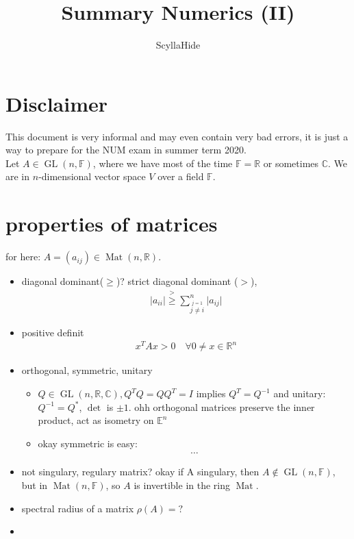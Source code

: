 \documentclass[]{scrartcl}
\title{Summary Numerics (II)}
\author{ScyllaHide}
\newcommand{\EE}{\mathbb{E}}
\newcommand{\C}{\mathbb{C}}
\newcommand{\R}{\mathbb{R}}
\newcommand{\F}{\mathbb{F}}
\newcommand{\<}{\trianglelefteq}
\newcommand{\abs}[1]{\vert #1\vert}
\DeclareMathOperator{\Mat}{Mat}
\DeclareMathOperator{\GL}{GL}
\begin{document}
\maketitle

\section*{Disclaimer}
This document is very informal and may even contain very bad errors, it is just a way to prepare for the NUM exam in summer term 2020.\\

Let $A \in \GL(n,\F)$, where we have most of the time $\F = \R$ or sometimes $\C$. We are in $n$-dimensional vector space $V$ over a field $\F$.

\section*{properties of matrices}
for here: $A = (a_{ij}) \in \Mat(n,\R)$.
\begin{itemize}
	\item diagonal dominant($\ge$)? strict diagonal dominant ($>$),
	\begin{align*}
		\abs{a_{ii}} \overset{>}{\ge} \sum_{\stackrel{j=1}{j\neq i}}^n \abs{a_{ij}}
	\end{align*}
	\item positive definit
	\begin{align*}
		x^T Ax > 0 \quad \forall 0\neq x \in \R^n
	\end{align*}
	\item orthogonal, symmetric, unitary
	\begin{itemize}
		\item $Q \in \GL(n,\R,\C), Q^T Q = Q Q^T = I$ implies $Q^T = Q^{-1}$ and unitary: $Q^{-1} = Q^{\ast}$, $\det$ is $\pm 1$. ohh orthogonal matrices preserve the inner product, act as isometry on $\EE^n$
		\item okay symmetric is easy:
		\begin{align*}
			\dots
		\end{align*}
	\end{itemize}
	\item not singulary, regulary matrix?
	okay if A singulary, then $A \notin \GL(n,\F)$, but in $\Mat(n, \F)$, so $A$ is invertible in the ring $\Mat$.
	\item spectral radius of a matrix $\rho(A) = ?$
	\item 
\end{itemize}
\end{document}
